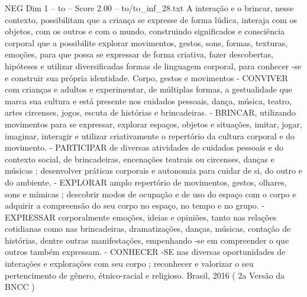 \begin{textsample}{NEG Dim 1 – to – Score 2.00 – to/to\_inf\_28.txt}
A interação e o brincar, nesse contexto, possibilitam que a criança se expresse de forma lúdica, interaja com os objetos, com os outros e com o mundo, construindo significados e consciência corporal que a possibilite explorar movimentos, gestos, sons, formas, texturas, emoções, para que possa se expressar de forma criativa, fazer descobertas, hipóteses e utilizar diversificadas formas de linguagem corporal, para conhecer -se e construir sua própria identidade.
Corpo, gestos e movimentos - CONVIVER com crianças e adultos e experimentar, de múltiplas formas, a gestualidade que marca sua cultura e está presente nos cuidados pessoais, dança, música, teatro, artes circenses, jogos, escuta de histórias e brincadeiras. - BRINCAR, utilizando movimentos para se expressar, explorar espaços, objetos e situações, imitar, jogar, imaginar, interagir e utilizar criativamente o repertório da cultura corporal e do movimento. - PARTICIPAR de diversas atividades de cuidados pessoais e do contexto social, de brincadeiras, encenações teatrais ou circenses, danças e músicas ; desenvolver práticas corporais e autonomia para cuidar de si, do outro e do ambiente. - EXPLORAR amplo repertório de movimentos, gestos, olhares, sons e mímicas ; descobrir modos de ocupação e de uso do espaço com o corpo e adquirir a compreensão do seu corpo no espaço, no tempo e no grupo. - EXPRESSAR corporalmente emoções, ideias e opiniões, tanto nas relações cotidianas como nas brincadeiras, dramatizações, danças, músicas, contação de histórias, dentre outras manifestações, empenhando -se em compreender o que outros também expressam. - CONHECER -SE nas diversas oportunidades de interações e explorações com seu corpo ; reconhecer e valorizar o seu pertencimento de gênero, étnico-racial e religioso.
Brasil, 2016 ( 2a Versão da BNCC )

\end{textsample}
